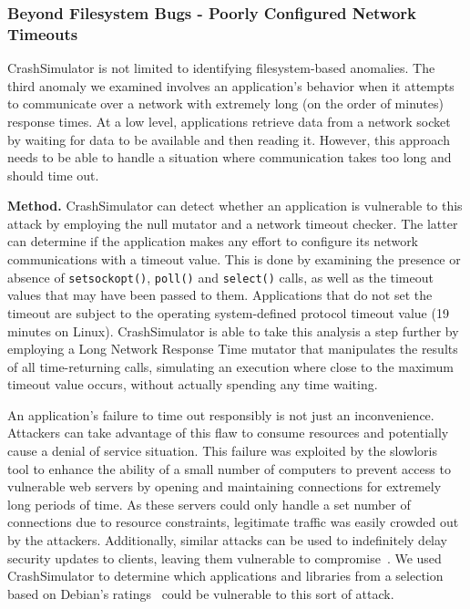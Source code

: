 \subsubsection{Beyond Filesystem Bugs - Poorly Configured Network Timeouts}
\label{sec-timeout-bugs}

CrashSimulator is not limited
to identifying filesystem-based anomalies.
The third anomaly we examined
involves an application's behavior
when it attempts to communicate
over a network with extremely long
(on the order of minutes) response times.
At a low level,
applications retrieve data from a network socket
by waiting for data to be available and then reading it.
However,
this approach needs to be able to handle
a situation where communication
takes too long and should time out.

{\bf Method.}
CrashSimulator can detect
whether an application is vulnerable to this attack
by employing the null mutator and a network timeout checker. The latter
can determine if the application makes any effort
to configure its network communications with a timeout value.
This is done by examining the presence or absence of {\tt setsockopt()}, {\tt poll()}
and {\tt select()} calls, as well as the timeout values that may
have been passed to them. Applications that do not set the timeout are
subject to the operating system-defined protocol timeout value (19 minutes on Linux).
CrashSimulator is able to take this analysis a step further by employing a Long Network Response Time mutator
that manipulates
the results of all time-returning calls,
simulating an execution where close to the maximum timeout value occurs,
without actually spending any time waiting.

An application's failure
to time out responsibly
is not just an inconvenience. Attackers can take advantage of this flaw
to consume resources and potentially cause a denial of service situation.
This failure was exploited by the slowloris~\cite{Slowloris} tool
to enhance the ability
of a small number of computers to prevent access
to vulnerable web servers
by opening and maintaining connections
for extremely long periods of time.
As these servers could only handle a set number of connections
due to resource constraints,
legitimate traffic was easily crowded out by the attackers.
Additionally, similar attacks can be used to
indefinitely delay security updates to
clients, leaving them vulnerable to compromise~\cite{Cappos_TR_08}.
We used CrashSimulator to determine which applications and
libraries from a selection based on Debian's ratings~\cite{DebPopCon}
could be vulnerable to this sort of attack.

